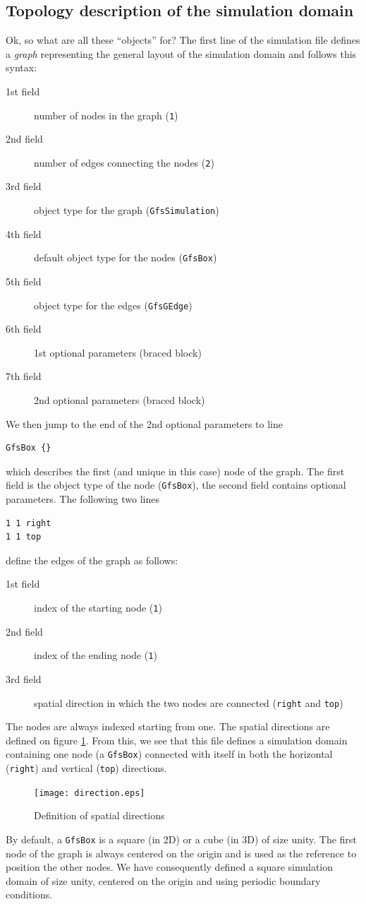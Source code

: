 \documentclass[a4paper]{article}
\begin{document}
\subsection{Topology description of the simulation domain}

Ok, so what are all these ``objects'' for?  The first line of the
simulation file defines a {\em graph} representing the general layout
of the simulation domain and follows this syntax:
\begin{description}
\item[1st field] number of nodes in the graph ({\tt 1})
\item[2nd field] number of edges connecting the nodes ({\tt 2})
\item[3rd field] object type for the graph ({\tt GfsSimulation})
\item[4th field] default object type for the nodes ({\tt GfsBox})
\item[5th field] object type for the edges ({\tt GfsGEdge})
\item[6th field] 1st optional parameters (braced block)
\item[7th field] 2nd optional parameters (braced block)
\end{description}
We then jump to the end of the 2nd optional parameters to line
\begin{verbatim}
GfsBox {}
\end{verbatim}
which describes the first (and unique in this case) node of the
graph. The first field is the object type of the node ({\tt GfsBox}),
the second field contains optional parameters.
The following two lines 
\begin{verbatim}
1 1 right
1 1 top
\end{verbatim}
define the edges of the graph as follows:
\begin{description}
\item[1st field] index of the starting node ({\tt 1})
\item[2nd field] index of the ending node   ({\tt 1})
\item[3rd field] spatial direction in which the two nodes are
connected ({\tt right} and {\tt top})
\end{description}
The nodes are always indexed starting from one. The spatial directions 
are defined on figure \ref{direction}.
From this, we see that this file defines a simulation domain
containing one node (a {\tt GfsBox}) connected with itself in both the
horizontal ({\tt right}) and vertical ({\tt top}) directions.
\begin{figure}[htbp]
\begin{center}
\texttt{[image: direction.eps]}
\end{center}
\caption{Definition of spatial directions}
\label{direction}
\end{figure}
By default, a {\tt GfsBox} is a square (in 2D) or a cube (in 3D) of
size unity. The first node of the graph is always centered on the
origin and is used as the reference to position the other nodes.  We
have consequently defined a square simulation domain of size unity,
centered on the origin and using periodic boundary conditions.
\end{document}

